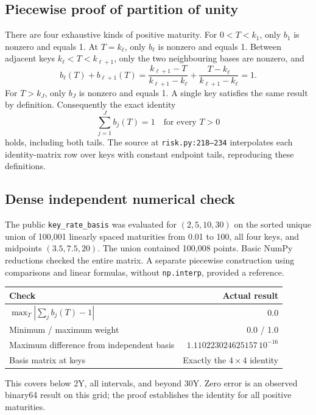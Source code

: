 \documentclass[12pt,a4paper]{article}
\begin{document}
\subsection{Piecewise proof of partition of unity}
There are four exhaustive kinds of positive maturity.
For $0<T<k_1$, only $b_1$ is nonzero and equals 1.
At $T=k_\ell$, only $b_\ell$ is nonzero and equals 1.
Between adjacent keys $k_\ell<T<k_{\ell+1}$, only the two neighbouring
bases are nonzero, and
\begin{equation}
 b_\ell(T)+b_{\ell+1}(T)
 =\frac{k_{\ell+1}-T}{k_{\ell+1}-k_\ell}
 +\frac{T-k_\ell}{k_{\ell+1}-k_\ell}=1.
\end{equation}
For $T>k_J$, only $b_J$ is nonzero and equals 1.
A single key satisfies the same result by definition.
Consequently the exact identity
\begin{equation}\label{eq:partition}
 \boxed{\sum_{j=1}^{J}b_j(T)=1\quad\text{for every }T>0}
\end{equation}
holds, including both tails.
The source at \texttt{risk.py:218--234} interpolates each identity-matrix
row over keys with constant endpoint tails, reproducing these definitions.

\subsection{Dense independent numerical check}
The public \texttt{key\_rate\_basis} was evaluated for $(2,5,10,30)$
on the sorted unique union of 100,001 linearly spaced maturities from
0.01 to 100, all four keys, and midpoints $(3.5,7.5,20)$.
The union contained 100,008 points. Basic NumPy reductions checked the
entire matrix. A separate piecewise construction using comparisons and
linear formulas, without \texttt{np.interp}, provided a reference.
\begin{center}\small
\begin{tabular}{@{}lr@{}}
\toprule
Check & Actual result\\
\midrule
$\max_T|\sum_j b_j(T)-1|$ & 0.0\\
Minimum / maximum weight & 0.0 / 1.0\\
Maximum difference from independent basis & $1.110223024625157\,10^{-16}$\\
Basis matrix at keys & Exactly the $4\times4$ identity\\
\bottomrule
\end{tabular}
\end{center}
This covers below 2Y, all intervals, and beyond 30Y.
Zero error is an observed binary64 result on this grid; the proof
establishes the identity for all positive maturities.
\end{document}
